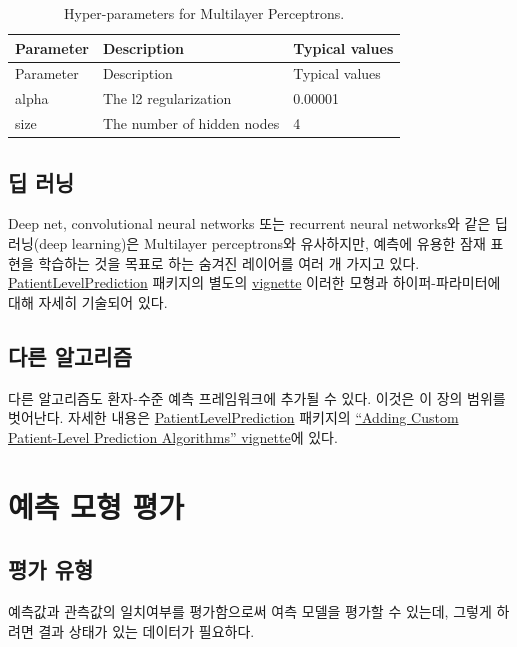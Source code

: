 \documentclass[11pt]{book}
\theoremstyle{definition}
\theoremstyle{definition}
\theoremstyle{definition}
\theoremstyle{remark}
\begin{document}
\begin{longtable}[]{@{}lll@{}}
\caption{\label{tab:mpParameters} Hyper-parameters for Multilayer
Perceptrons.}\tabularnewline
\toprule
Parameter & Description & Typical values\tabularnewline
\midrule
\endfirsthead
\toprule
Parameter & Description & Typical values\tabularnewline
\midrule
\endhead
alpha & The l2 regularization & 0.00001\tabularnewline
size & The number of hidden nodes & 4\tabularnewline
\bottomrule
\end{longtable}

\subsection{딥 러닝}\label{-}

Deep net, convolutional neural networks 또는 recurrent neural networks와
같은 딥 러닝(deep learning)은 Multilayer perceptrons와 유사하지만,
예측에 유용한 잠재 표현을 학습하는 것을 목표로 하는 숨겨진 레이어를 여러
개 가지고 있다.
\href{https://ohdsi.github.io/PatientLevelPrediction/}{PatientLevelPrediction}
패키지의 별도의
\href{https://ohdsi.github.io/PatientLevelPrediction/articles/BuildingDeepLearningModels.html}{vignette}
이러한 모형과 하이퍼-파라미터에 대해 자세히 기술되어
있다. 

\subsection{다른 알고리즘}\label{-}

다른 알고리즘도 환자-수준 예측 프레임워크에 추가될 수 있다. 이것은 이
장의 범위를 벗어난다. 자세한 내용은
\href{https://ohdsi.github.io/PatientLevelPrediction/}{PatientLevelPrediction}
패키지의
\href{https://ohdsi.github.io/PatientLevelPrediction/articles/AddingCustomAlgorithms.html}{``Adding
Custom Patient-Level Prediction Algorithms'' vignette}에 있다.

\section{예측 모형 평가}\label{--}

\subsection{평가 유형}\label{-}

예측값과 관측값의 일치여부를 평가함으로써 여측 모델을 평가할 수 있는데,
그렇게 하려면 결과 상태가 있는 데이터가 필요하다.
\end{document}
